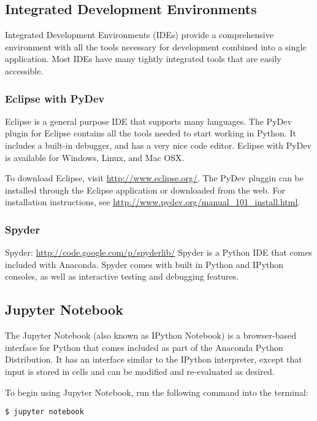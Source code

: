 \subsection*{Integrated Development Environments}
Integrated Development Environments (IDEs) provide a comprehensive environment with all the tools necessary for development combined into a single application.
Most IDEs have many tightly integrated tools that are easily accessible.


\subsubsection*{Eclipse with PyDev}

Eclipse is a general purpose IDE that supports many languages.
The PyDev plugin for Eclipse contains all the tools needed to start working in Python.
It includes a built-in debugger, and has a very nice code editor.
Eclipse with PyDev is available for Windows, Linux, and Mac OSX.

To download Eclipse, visit \url{http://www.eclipse.org/}.
 The PyDev pluggin can be installed through the Eclipse application or downloaded from the web.
For installation instructions, see \url{http://www.pydev.org/manual_101_install.html}.

\subsubsection*{Spyder}

Spyder: \url{http://code.google.com/p/spyderlib/}
Spyder is a Python IDE that comes included with Anaconda.
Spyder comes with built in Python and IPython consoles, as well as interactive testing and debugging features.

\subsection*{Jupyter Notebook}

The Jupyter Notebook (also known as IPython Notebook) is a browser-based interface for Python that comes included as part of the Anaconda Python Distribution. It has an interface similar to the IPython interpreter, except that input is stored in cells and can be modified and re-evaluated as desired.

To begin using Jupyter Notebook, run the following command into the terminal:
\begin{lstlisting}
$ jupyter notebook
\end{lstlisting}

